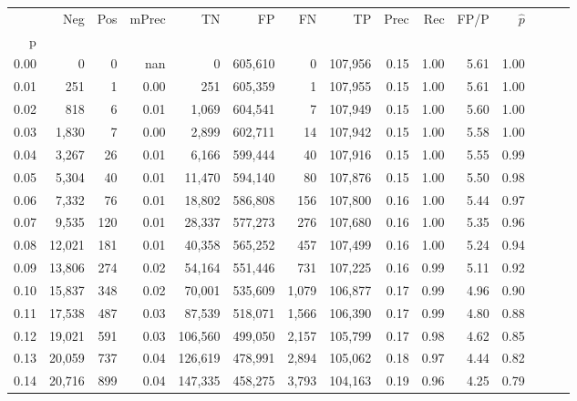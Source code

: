 \begin{tabular}{rrrrrrrrrrrrrrr}
\toprule
{} &     Neg &    Pos & mPrec &       TN &       FP &       FN &       TP &  Prec &   Rec &  FP/P & $\hat{p}$ \\
p    &         &        &       &          &          &          &          &       &       &       &           \\
\midrule
0.00 &       0 &      0 &   nan &        0 &  605,610 &        0 &  107,956 &  0.15 &  1.00 &  5.61 &      1.00 \\
0.01 &     251 &      1 &  0.00 &      251 &  605,359 &        1 &  107,955 &  0.15 &  1.00 &  5.61 &      1.00 \\
0.02 &     818 &      6 &  0.01 &    1,069 &  604,541 &        7 &  107,949 &  0.15 &  1.00 &  5.60 &      1.00 \\
0.03 &   1,830 &      7 &  0.00 &    2,899 &  602,711 &       14 &  107,942 &  0.15 &  1.00 &  5.58 &      1.00 \\
0.04 &   3,267 &     26 &  0.01 &    6,166 &  599,444 &       40 &  107,916 &  0.15 &  1.00 &  5.55 &      0.99 \\
0.05 &   5,304 &     40 &  0.01 &   11,470 &  594,140 &       80 &  107,876 &  0.15 &  1.00 &  5.50 &      0.98 \\
0.06 &   7,332 &     76 &  0.01 &   18,802 &  586,808 &      156 &  107,800 &  0.16 &  1.00 &  5.44 &      0.97 \\
0.07 &   9,535 &    120 &  0.01 &   28,337 &  577,273 &      276 &  107,680 &  0.16 &  1.00 &  5.35 &      0.96 \\
0.08 &  12,021 &    181 &  0.01 &   40,358 &  565,252 &      457 &  107,499 &  0.16 &  1.00 &  5.24 &      0.94 \\
0.09 &  13,806 &    274 &  0.02 &   54,164 &  551,446 &      731 &  107,225 &  0.16 &  0.99 &  5.11 &      0.92 \\
0.10 &  15,837 &    348 &  0.02 &   70,001 &  535,609 &    1,079 &  106,877 &  0.17 &  0.99 &  4.96 &      0.90 \\
0.11 &  17,538 &    487 &  0.03 &   87,539 &  518,071 &    1,566 &  106,390 &  0.17 &  0.99 &  4.80 &      0.88 \\
0.12 &  19,021 &    591 &  0.03 &  106,560 &  499,050 &    2,157 &  105,799 &  0.17 &  0.98 &  4.62 &      0.85 \\
0.13 &  20,059 &    737 &  0.04 &  126,619 &  478,991 &    2,894 &  105,062 &  0.18 &  0.97 &  4.44 &      0.82 \\
0.14 &  20,716 &    899 &  0.04 &  147,335 &  458,275 &    3,793 &  104,163 &  0.19 &  0.96 &  4.25 &      0.79 \\

\end{tabular}

